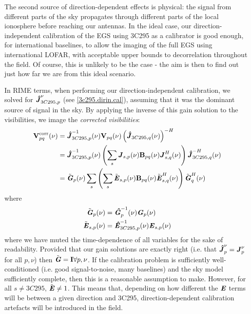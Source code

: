 \pg
The second source of direction-dependent effects is physical: the signal from different parts of the sky propagates through different parts of the local ionosphere before reaching our antennas. In the ideal case, our direction-independent calibration of the EGS using 3C295 as a calibrator is good enough, for international baselines, to allow the imaging of the full EGS using international LOFAR, with acceptable upper bounds to decorrelation throughout the field. Of course, this is unlikely to be the case - the aim is then to find out just how far we are from this ideal scenario.

\pg
In RIME terms, when performing our direction-independent calibration, we solved for $\textbf{\emph{\^{J}}}_{3C295,p}^{\nu}$ (see \cref{3c295.dirin.cal}), assuming that it was the dominant source of signal in the sky. By applying the inverse of this gain solution to the visibilities, we image the \textit{corrected visibilities}:
\begin{align}
\textbf{V}_{pq}^\mathrm{corr} (\nu) &= \textbf{\emph{\^{J}}}_{3C295,p}^{-1}(\nu) \textbf{V}_{pq}(\nu) \left(\textbf{\emph{\^{J}}}_{3C295,q}(\nu)\right)^{-H}\\
                        &=  \textbf{\emph{\^{J}}}_{3C295,p}^{-1}(\nu) \left(\sum_s \textbf{\emph{J}}_{s,p}(\nu)\textbf{B}_{pq}(\nu) \textbf{\emph{J}}^H_{s,q}(\nu)\right) \textbf{\emph{\^{J}}}^{-H}_{3C295,q}(\nu)\\
                        &= \tilde{\textbf{\emph{G}}}_{p}(\nu) \sum_s \left( \sum_s \tilde{\textbf{\emph{E}}}_{s,p}(\nu)\textbf{B}_{pq}(\nu) \tilde{\textbf{\emph{E}}}_{s,q}^H(\nu)\right) \tilde{\textbf{\emph{G}}}^H_{q}(\nu)
\end{align}
where
\begin{align}
\tilde{\textbf{\emph{G}}}_{p}(\nu) &= \textbf{\emph{\^{G}}}_{p}^{-1}(\nu)\textbf{\emph{G}}_{p}(\nu)\\
\tilde{\textbf{\emph{E}}}_{s,p}(\nu) &= \textbf{\emph{\^{E}}}_{3C295,p}^{-1}(\nu)\textbf{\emph{E}}_{s,p}(\nu)
\end{align}                        
where we have muted the time-dependence of all variables for the sake of readability. Provided that our gain solutions are exactly right (i.e. that $\textbf{\emph{\^{J}}}_p^{\nu}=\textbf{\emph{J}}_p^{\nu}$ for all $p,\nu$) then $\tilde{\textbf{\emph{G}}}=\bm{\mathrm{I}} \forall p,\nu$. If the calibration problem is sufficiently well-conditioned (i.e. good signal-to-noise, many baselines) and the sky model sufficiently complete, then this is a reasonable assumption to make. However, for all $s\ne 3C295$, $\tilde{\textbf{\emph{E}}}\ne 1$. This means that, depending on how different the $\textbf{\emph{E}}$ terms will be between a given direction and 3C295, direction-dependent calibration artefacts will be introduced in the field. 

